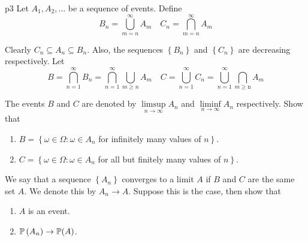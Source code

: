 \documentclass[a4paper, 11pt]{article}
\begin{document}
\begin{problem}{%
	}{p3%
	}
Let $A_1, A_2, \ldots$ be a sequence of events. Define
$$
B_n=\bigcup_{m=n}^{\infty} A_m \quad C_n=\bigcap_{m=n}^{\infty} A_m
$$

Clearly $C_n \subseteq A_n \subseteq B_n$. Also, the sequences $\left\{B_n\right\}$ and $\left\{C_n\right\}$ are decreasing respectively. Let
$$
B=\bigcap_{n=1}^{\infty} B_n=\bigcap_{n=1}^{\infty} \bigcup_{m \geq n} A_m \quad C=\bigcup_{n=1}^{\infty} C_n=\bigcup_{n=1}^{\infty} \bigcap_{m \geq \mathrm{n}} A_m
$$

The events $B$ and $C$ are denoted by $\limsup\limits_{n \rightarrow \infty} A_n$ and $\liminf\limits_{n \rightarrow \infty} A_n$ respectively. Show that
\begin{enumerate}[label=(\alph*)]
	\item $B=\left\{\omega \in \Omega: \omega \in A_n\right.$ for infinitely many values of $\left.n\right\}$.
	\item $C=\left\{\omega \in \Omega: \omega \in A_n\right.$ for all but finitely many values of $\left.n\right\}$.
\end{enumerate}	
	We say that a sequence $\left\{A_n\right\}$ converges to a limit $A$ if $B$ and $C$ are the same set $A$. We denote this by $A_n \rightarrow A$. Suppose this is the case, then show that
	
	\begin{enumerate}[resume, label=(\alph*)]
		\item $A$ is an event.
	\item $\mathbb{P}\left(A_n\right) \rightarrow \mathbb{P}(A)$.
\end{enumerate} 

\end{problem}
\end{document}
